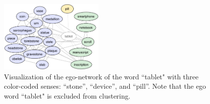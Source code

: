 \documentclass[11pt]{article}
\newcommand{\parm}{ \mathord{\bullet}}
\begin{document}

 
 
\begin{figure}
\begin{center}
\includegraphics[width=0.45\textwidth]{figures/graph-clustering-new}
\end{center}
\caption{Visualization of the ego-network of the word ``tablet"  with three color-coded senses: ``stone'',  ``device'', and ``pill''. Note that the ego word ``tablet" is excluded from clustering.}
\label{graph-clustering-example}
\end{figure}
 
  
\end{document}
